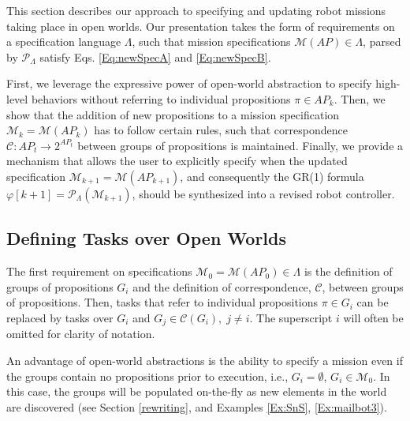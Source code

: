 This section describes our approach to specifying and updating robot missions taking place in open worlds. 
Our presentation takes the form of requirements on a specification language $\Lambda$, such that mission specifications $\mathcal{M}(AP) \in \Lambda$, parsed by $\mathcal{P}_{\Lambda}$ satisfy Eqs. \eqref{Eq:newSpecA} and \eqref{Eq:newSpecB}. 

First, we leverage the expressive power of open-world abstraction to specify high-level behaviors without referring to individual propositions $\pi \in AP_k$. 
Then, we show that the addition of new propositions to a mission specification $\mathcal{M}_k = \mathcal{M}(AP_k)$ has to follow certain rules, such that correspondence $\mathcal{C}: AP_t \rightarrow 2^{AP_t}$ between groups of propositions is maintained.
Finally, we provide a mechanism that allows the user to explicitly specify when the updated specification $\mathcal{M}_{k+1} = \mathcal{M}(AP_{k+1})$, and consequently the GR(1) formula 
$\varphi [k+1] = \mathcal{P}_{\Lambda} (\mathcal{M}_{k+1})$,
should be synthesized into a revised robot controller.

\subsection{Defining Tasks over Open Worlds}

The first requirement on specifications $\mathcal{M}_0 = \mathcal{M}(AP_0) \in \Lambda$ is the definition of groups of propositions $G_i$ and the definition of correspondence, $\mathcal{C}$, between groups of propositions. Then, tasks that refer to individual propositions $\pi \in G_i$ can be replaced by tasks over $G_i$ and $G_j \in \mathcal{C}(G_i), \; j \not = i$. The superscript $i$ will often be omitted for clarity of notation.

An advantage of open-world abstractions is the ability to specify a mission even if the groups contain no propositions prior to execution, i.e., $G_i = \emptyset$, $G_i \in \mathcal{M}_0$. In this case, the groups will be populated on-the-fly as new elements in the world are discovered (see Section \ref{rewriting}, and Examples \ref{Ex:SnS}, \ref{Ex:mailbot3}).

